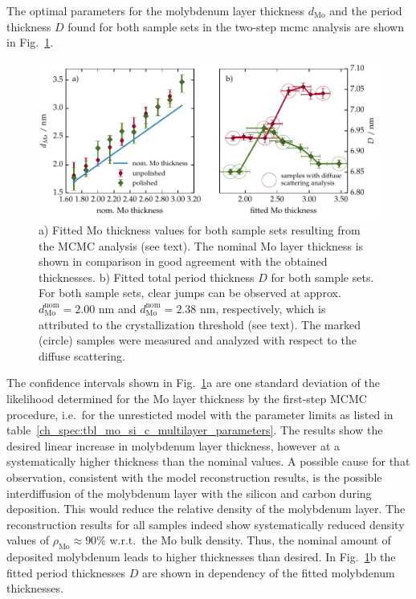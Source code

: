 The optimal parameters for the molybdenum layer thickness $d_\text{Mo}$ and the period thickness $D$ found for both sample sets in the two-step \gls{mcmc} analysis are shown in Fig.~\ref{ch_spec:fig_MoSi_fitted_mo_and_fitted_D}.
\begin{figure}[htbp]
\centering
\includegraphics[width=\textwidth]{img/fitted_mo_and_fitted_D}
\caption{a) Fitted Mo thickness values for both sample sets resulting from the MCMC analysis (see text). The nominal Mo layer thickness is shown in comparison in good agreement with the obtained thicknesses. b) Fitted total period thickness $D$ for both sample sets. For both sample sets, clear jumps can be observed at approx.~$d^\text{nom}_\text{Mo} =2.00$ nm and $d^\text{nom}_\text{Mo} =2.38$ nm, respectively, which is attributed to the crystallization threshold (see text). The marked (circle) samples were measured and analyzed with respect to the diffuse scattering.}
\label{ch_spec:fig_MoSi_fitted_mo_and_fitted_D}
\end{figure}
The confidence intervals shown in Fig.~\ref{ch_spec:fig_MoSi_fitted_mo_and_fitted_D}a are one standard deviation of the likelihood determined for the Mo layer thickness by the first-step MCMC procedure, i.e.~for the unresticted model with the parameter limits as listed in table~\ref{ch_spec:tbl_mo_si_c_multilayer_parameters}. The results show the desired linear increase in molybdenum layer thickness, however at a systematically higher thickness than the nominal values. A possible cause for that observation, consistent with the model reconstruction results, is the possible interdiffusion of the molybdenum layer with the silicon and carbon during deposition. This would reduce the relative density of the molybdenum layer. The reconstruction results for all samples indeed show systematically reduced density values of $\rho_\text{Mo} \approx 90\%$ w.r.t.~the Mo bulk density. Thus, the nominal amount of deposited molybdenum leads to higher thicknesses than desired. In Fig.~\ref{ch_spec:fig_MoSi_fitted_mo_and_fitted_D}b the fitted period thicknesses $D$ are shown in dependency of the fitted molybdenum thicknesses.

